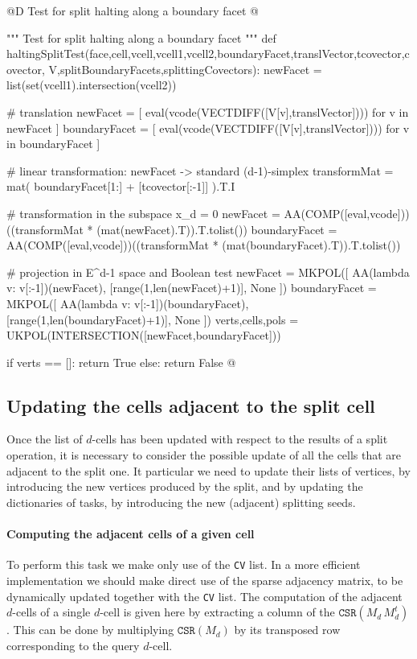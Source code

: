 \documentclass[11pt,oneside]{article}	%
\begin{document}
@D Test for split halting along a boundary facet
@{""" Test for split halting along a boundary facet """
def haltingSplitTest(face,cell,vcell,vcell1,vcell2,boundaryFacet,translVector,tcovector,covector,
						V,splitBoundaryFacets,splittingCovectors):
	newFacet = list(set(vcell1).intersection(vcell2))
	
	# translation 
	newFacet = [ eval(vcode(VECTDIFF([V[v],translVector]))) for v in newFacet ]
	boundaryFacet = [ eval(vcode(VECTDIFF([V[v],translVector]))) for v in boundaryFacet ]
	
	# linear transformation: newFacet -> standard (d-1)-simplex
	transformMat = mat( boundaryFacet[1:] + [tcovector[:-1]] ).T.I
	
	# transformation in the subspace x_d = 0
	newFacet = AA(COMP([eval,vcode]))((transformMat * (mat(newFacet).T)).T.tolist())
	boundaryFacet = AA(COMP([eval,vcode]))((transformMat * (mat(boundaryFacet).T)).T.tolist())
	
	# projection in E^{d-1} space and Boolean test
	newFacet = MKPOL([ AA(lambda v: v[:-1])(newFacet), [range(1,len(newFacet)+1)], None ])
	boundaryFacet = MKPOL([ AA(lambda v: v[:-1])(boundaryFacet), [range(1,len(boundaryFacet)+1)], None ])
	verts,cells,pols = UKPOL(INTERSECTION([newFacet,boundaryFacet]))
	
	if verts == []: return True
	else: return False
@}



\subsection{Updating the cells adjacent to the split cell}

Once the list of $d$-cells has been updated with respect to the results of a split operation, it is necessary to consider the possible update of all the cells that are adjacent to the split one.  It particular we need to update their lists of vertices, by introducing the new vertices produced by the split, and by updating the dictionaries of tasks, by introducing the new (adjacent) splitting seeds.

\paragraph{Computing the adjacent cells of a given cell}
To perform this task we make only use of the \texttt{CV} list. In a more efficient implementation we should make direct use of the sparse adjacency matrix, to be dynamically updated together with the \texttt{CV} list.
The computation of the adjacent $d$-cells of a single $d$-cell is given here by extracting a column of the $\texttt{CSR}(M_d\, M_d^t)$. This can be done by multiplying $\texttt{CSR}(M_d)$ by its transposed row corresponding to the query $d$-cell. 
\end{document}
